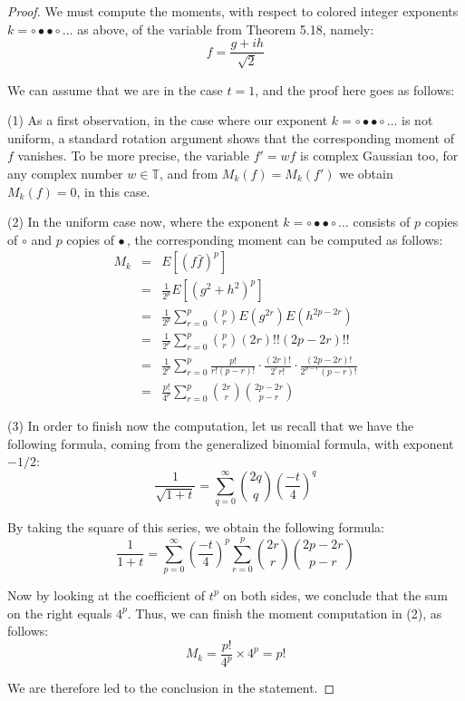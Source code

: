 \documentclass[12pt]{amsbook}
\begin{document}
\begin{proof}
We must compute the moments, with respect to colored integer exponents $k=\circ\bullet\bullet\circ\ldots$ as above, of the variable from Theorem 5.18, namely:
$$f=\frac{g+ih}{\sqrt{2}}$$

We can assume that we are in the case $t=1$, and the proof here goes as follows:

\medskip

(1) As a first observation, in the case where our exponent $k=\circ\bullet\bullet\circ\ldots$ is not uniform, a standard rotation argument shows that the corresponding moment of $f$ vanishes. To be more precise, the variable $f'=wf$ is complex Gaussian too, for any complex number $w\in\mathbb T$, and from $M_k(f)=M_k(f')$ we obtain $M_k(f)=0$, in this case.

\medskip

(2) In the uniform case now, where the exponent $k=\circ\bullet\bullet\circ\ldots$ consists of $p$ copies of $\circ$ and $p$ copies of $\bullet$\,, the corresponding moment can be computed as follows:
\begin{eqnarray*}
M_k
&=&E[(f\bar{f})^p]\\
&=&\frac{1}{2^p}E[(g^2+h^2)^p]\\
&=&\frac{1}{2^p}\sum_{r=0}^p\binom{p}{r}E(g^{2r})E(h^{2p-2r})\\
&=&\frac{1}{2^p}\sum_{r=0}^p\binom{p}{r}(2r)!!(2p-2r)!!\\
&=&\frac{1}{2^p}\sum_{r=0}^p\frac{p!}{r!(p-r)!}\cdot\frac{(2r)!}{2^rr!}\cdot\frac{(2p-2r)!}{2^{p-r}(p-r)!}\\
&=&\frac{p!}{4^p}\sum_{r=0}^p\binom{2r}{r}\binom{2p-2r}{p-r}
\end{eqnarray*}

(3) In order to finish now the computation, let us recall that we have the following formula, coming from the generalized binomial formula, with exponent $-1/2$:
$$\frac{1}{\sqrt{1+t}}=\sum_{q=0}^\infty\binom{2q}{q}\left(\frac{-t}{4}\right)^q$$

By taking the square of this series, we obtain the following formula:
$$\frac{1}{1+t}
=\sum_{p=0}^\infty\left(\frac{-t}{4}\right)^p\sum_{r=0}^p\binom{2r}{r}\binom{2p-2r}{p-r}$$

Now by looking at the coefficient of $t^p$ on both sides, we conclude that the sum on the right equals $4^p$. Thus, we can finish the moment computation in (2), as follows:
$$M_k=\frac{p!}{4^p}\times 4^p=p!$$

We are therefore led to the conclusion in the statement.
\end{proof}
\end{document}
